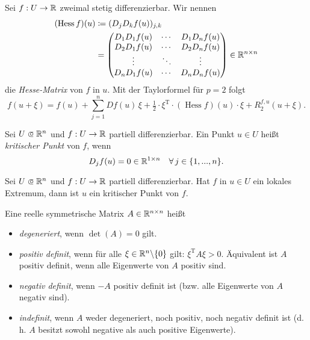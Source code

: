 \documentclass{cheat-sheet}
\DeclareMathOperator{\Hess}{Hess} %
\begin{document}
\begin{bem}[Taylorformel für $p = 2$]
  Sei $f : U \to \mathbb{R}$ zweimal stetig differenzierbar. Wir nennen
  \begin{align*}
    (\Hess f)(u) &\coloneqq (D_j D_k f(u))_{j,k}\\
    &= \begin{pmatrix} D_1 D_1 f(u) & \cdots & D_1 D_n f(u) \\ D_2 D_1 f(u) & \cdots & D_2 D_n f(u) \\ \vdots & \ddots & \vdots \\ D_n D_1 f(u) & \cdots & D_n D_n f(u) \end{pmatrix} \in \R^{n \times n}
  \end{align*}
  die \emph{Hesse-Matrix} von $f$ in $u$. Mit der Taylorformel für $p = 2$ folgt
  \[ f(u + \xi) = f(u) + \sum_{j=1}^{n} D f(u)\,\xi + \tfrac{1}{2} \cdot \xi^{\text{T}} \cdot (\Hess f)(u) \cdot \xi + R_2^{f,u}(u + \xi). \]
\end{bem}

\begin{defn}
  Sei $U \opn \R^n$ und $f : U \to \mathbb{R}$ partiell differenzierbar. Ein Punkt $u \in U$ heißt \emph{kritischer Punkt} von $f$, wenn
  \[ D_j f(u) = 0 \in \mathbb{R}^{1 \times n}\quad \forall\,j \in \{ 1, ..., n \}. \]
\end{defn}

\begin{satz}
  Sei $U \opn \R^n$ und $f : U \to \mathbb{R}$ partiell differenzierbar. Hat $f$ in $u \in U$ ein lokales Extremum, dann ist $u$ ein kritischer Punkt von $f$.
\end{satz}

\begin{defn}
  Eine reelle symmetrische Matrix $A \in \mathbb{R}^{n \times n}$ heißt
  \begin{itemize}
    \item \emph{degeneriert}, wenn $\det(A) = 0$ gilt.
    \item \emph{positiv definit}, wenn für alle $\xi \in \mathbb{R}^n \backslash \{ 0 \}$ gilt: $\xi^{\text{T}}A\xi > 0.$ Äquivalent ist $A$ positiv definit, wenn alle Eigenwerte von $A$ positiv sind.
    \item \emph{negativ definit}, wenn $-A$ positiv definit ist (bzw. alle Eigenwerte von $A$ negativ sind).
    \item \emph{indefinit}, wenn $A$ weder degeneriert, noch positiv, noch negativ definit ist (d.\,h. $A$ besitzt sowohl negative als auch positive Eigenwerte).
  \end{itemize}
\end{defn}
\end{document}
